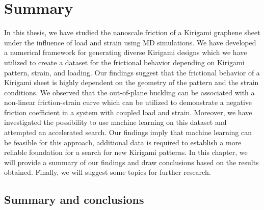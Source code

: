 \chapter{Summary}\label{chap:summary}

In this thesis, we have studied the nanoscale friction of a Kirigami graphene sheet
under the influence of load and strain using \acrshort{MD} simulations. We have
developed a numerical framework for generating diverse Kirigami designs which we have utilized to create a dataset for the frictional behavior depending on Kirigami pattern, strain, and loading. Our findings suggest that the frictional
behavior of a Kirigami sheet is highly dependent on the geometry of the pattern
and the strain conditions. We observed that the out-of-plane buckling can be
associated with a non-linear friction-strain curve which can be utilized to
demonstrate a negative friction coefficient in a system with coupled load and
strain. Moreover, we have investigated the possibility to use machine learning
on this dataset and attempted an accelerated search. Our findings imply that 
machine learning can be feasible for this approach,  additional data is required to
establish a more reliable foundation for a search for new Kirigami patterns. In this chapter, we will provide a summary of our findings and draw conclusions based on the results obtained. Finally, we will suggest some topics for further research.


\section{Summary and conclusions}

